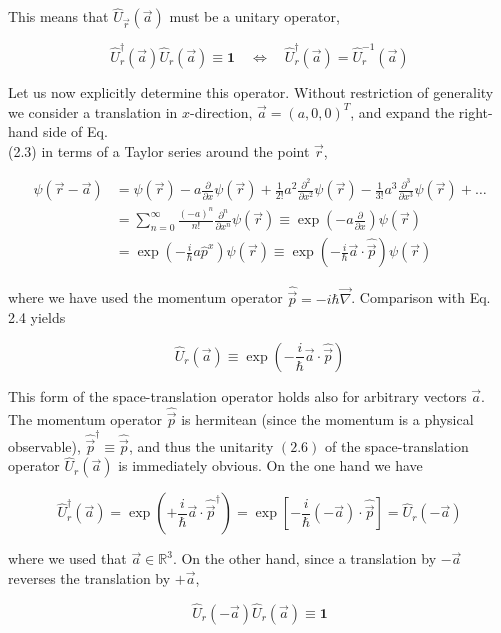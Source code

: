 \documentclass[10pt, letterpaper]{article}
\begin{document}
This means that $\hat{U}_{\vec{r}}(\vec{a})$ must be a unitary operator,

$$
\hat{U}_{r}^{\dagger}(\vec{a}) \hat{U}_{r}(\vec{a}) \equiv \mathbf{1} \quad \Longleftrightarrow \quad \hat{U}_{r}^{\dagger}(\vec{a})=\hat{U}_{r}^{-1}(\vec{a})
$$

Let us now explicitly determine this operator. Without restriction of generality we consider a translation in $x$-direction, $\vec{a}=(a, 0,0)^{T}$, and expand the right-hand side of Eq.\\
(2.3) in terms of a Taylor series around the point $\vec{r}$,

$$
\begin{aligned}
\psi(\vec{r}-\vec{a}) & =\psi(\vec{r})-a \frac{\partial}{\partial x} \psi(\vec{r})+\frac{1}{2!} a^{2} \frac{\partial^{2}}{\partial x^{2}} \psi(\vec{r})-\frac{1}{3!} a^{3} \frac{\partial^{3}}{\partial x^{3}} \psi(\vec{r})+\ldots \\
& =\sum_{n=0}^{\infty} \frac{(-a)^{n}}{n!} \frac{\partial^{n}}{\partial x^{n}} \psi(\vec{r}) \equiv \exp \left(-a \frac{\partial}{\partial x}\right) \psi(\vec{r}) \\
& =\exp \left(-\frac{i}{\hbar} a \hat{p}^{x}\right) \psi(\vec{r}) \equiv \exp \left(-\frac{i}{\hbar} \vec{a} \cdot \hat{\vec{p}}\right) \psi(\vec{r})
\end{aligned}
$$

where we have used the momentum operator $\hat{\vec{p}}=-i \hbar \vec{\nabla}$. Comparison with Eq. 2.4 yields

$$
\hat{U}_{r}(\vec{a}) \equiv \exp \left(-\frac{i}{\hbar} \vec{a} \cdot \hat{\vec{p}}\right)
$$

This form of the space-translation operator holds also for arbitrary vectors $\vec{a}$. The momentum operator $\hat{\vec{p}}$ is hermitean (since the momentum is a physical observable), $\hat{\vec{p}}^{\dagger} \equiv \hat{\vec{p}}$, and thus the unitarity $(2.6)$ of the space-translation operator $\hat{U}_{r}(\vec{a})$ is immediately obvious. On the one hand we have

$$
\hat{U}_{r}^{\dagger}(\vec{a})=\exp \left(+\frac{i}{\hbar} \vec{a} \cdot \hat{\vec{p}}^{\dagger}\right)=\exp \left[-\frac{i}{\hbar}(-\vec{a}) \cdot \hat{\vec{p}}\right]=\hat{U}_{r}(-\vec{a})
$$

where we used that $\vec{a} \in \mathbb{R}^{3}$. On the other hand, since a translation by $-\vec{a}$ reverses the translation by $+\vec{a}$,

$$
\hat{U}_{r}(-\vec{a}) \hat{U}_{r}(\vec{a}) \equiv \mathbf{1}
$$
\end{document}
